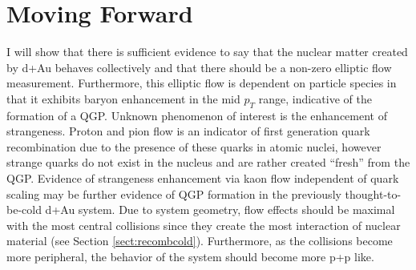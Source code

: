 \section{Moving Forward}
I will show that there is sufficient evidence to say that the nuclear matter created by d+Au behaves collectively and that there should be a non-zero elliptic flow measurement. Furthermore, this elliptic flow is dependent on particle species in that it exhibits baryon enhancement in the mid $p_T$ range, indicative of the formation of a QGP. Unknown phenomenon of interest is the enhancement of strangeness. Proton and pion flow is an indicator of first generation quark recombination due to the presence of these quarks in atomic nuclei, however strange quarks do not exist in the nucleus and are rather created ``fresh'' from the QGP.  Evidence of strangeness enhancement via kaon flow independent of quark scaling may be further evidence of QGP formation in the previously thought-to-be-cold d+Au system. Due to system geometry, flow effects should be maximal with the most central collisions since they create the most interaction of nuclear material (see Section \ref{sect:recombcold}). Furthermore, as the collisions become more peripheral, the behavior of the system should become more p+p like.
\pagebreak
\pagebreak
